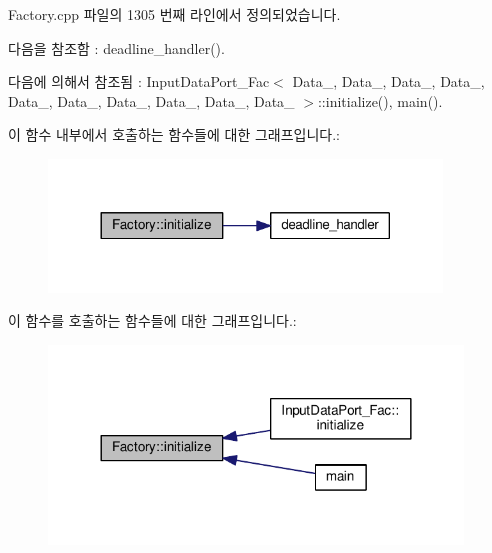 Factory.\+cpp 파일의 1305 번째 라인에서 정의되었습니다.



다음을 참조함 \+:  deadline\+\_\+handler().



다음에 의해서 참조됨 \+:  Input\+Data\+Port\+\_\+\+Fac$<$ Data\+\_, Data\+\_, Data\+\_, Data\+\_, Data\+\_, Data\+\_, Data\+\_, Data\+\_, Data\+\_, Data\+\_ $>$\+::initialize(), main().



이 함수 내부에서 호출하는 함수들에 대한 그래프입니다.\+:\nopagebreak
\begin{figure}[H]
\begin{center}
\leavevmode
\includegraphics[width=296pt]{classFactory_a64a97c299b156747868846be05ad9257_cgraph}
\end{center}
\end{figure}




이 함수를 호출하는 함수들에 대한 그래프입니다.\+:\nopagebreak
\begin{figure}[H]
\begin{center}
\leavevmode
\includegraphics[width=312pt]{classFactory_a64a97c299b156747868846be05ad9257_icgraph}
\end{center}
\end{figure}


